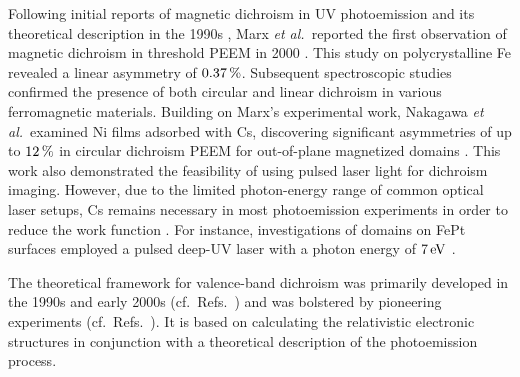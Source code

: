 \documentclass[prl,twocolumn,floatfix,superscriptaddress]{revtex4-2}
\begin{document}
Following initial reports of magnetic dichroism in UV photoemission and its theoretical description in the 1990s \cite{schneider1991,henk1996,feder1996}, Marx \textit{et al.}\ reported the first observation of magnetic dichroism in threshold PEEM in 2000 \cite{marx2000}. This study on polycrystalline Fe revealed a linear asymmetry of $\unit[0.37]{\%}$. Subsequent spectroscopic studies confirmed the presence of both circular and linear dichroism in various ferromagnetic materials. Building on Marx's experimental work, Nakagawa \textit{et al.}\ examined Ni films adsorbed with Cs, discovering significant asymmetries of up to $\unit[12]{\%}$ in circular dichroism PEEM for out-of-plane magnetized domains \cite{nakagawa2007,nakagawa2009,nakagawa2012}. This work also demonstrated the feasibility of using pulsed laser light for dichroism imaging. However, due to the limited photon-energy range of common optical laser setups, Cs remains necessary in most photoemission experiments in order to reduce the work function \cite{kronseder2011, meier2017}. For instance, investigations of domains on FePt surfaces employed a pulsed deep-UV laser with a photon energy of $\unit[7]{eV}$ \cite{zhao2019}. 

The theoretical framework for valence-band dichroism was primarily developed in the 1990s and early 2000s (cf.\ Refs.~) and was bolstered by pioneering experiments (cf.\ Refs.~). It is based on calculating the relativistic electronic  structures in conjunction with a theoretical description of the photoemission process. 
\end{document}
